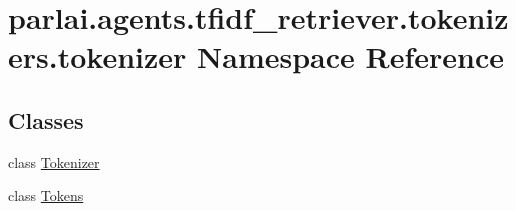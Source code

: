 \hypertarget{namespaceparlai_1_1agents_1_1tfidf__retriever_1_1tokenizers_1_1tokenizer}{}\section{parlai.\+agents.\+tfidf\+\_\+retriever.\+tokenizers.\+tokenizer Namespace Reference}
\label{namespaceparlai_1_1agents_1_1tfidf__retriever_1_1tokenizers_1_1tokenizer}
\subsection*{Classes}
\begin{DoxyCompactItemize}
\item 
class \hyperlink{classparlai_1_1agents_1_1tfidf__retriever_1_1tokenizers_1_1tokenizer_1_1Tokenizer}{Tokenizer}
\item 
class \hyperlink{classparlai_1_1agents_1_1tfidf__retriever_1_1tokenizers_1_1tokenizer_1_1Tokens}{Tokens}
\end{DoxyCompactItemize}
